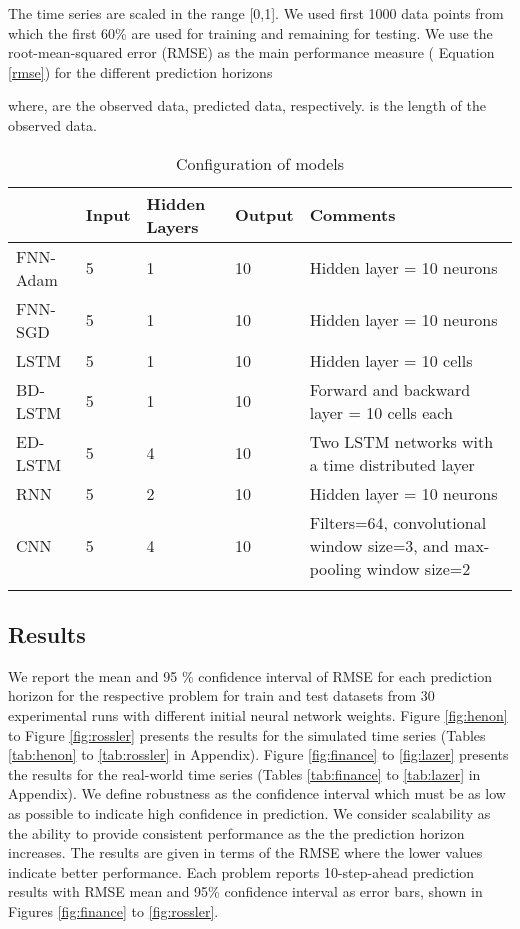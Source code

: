 \documentclass{ieeeaccess}
\begin{document}
The  time series  are  scaled in the range [0,1].  We used first 1000 data points  from which the first 60\% are used for training and remaining for testing. We use the root-mean-squared error (RMSE)   as the main performance measure ( Equation \ref{rmse})
for the different prediction horizons  
 
 
 
\noindent where,    are the observed data,
predicted data, respectively.  is the length of the observed data. 
 
 
\begin{table*}[htbp!]
 \small 
 \centering
 \caption{Configuration of models }
\label{tab:config}
\begin{tabular}{llllp{11cm}}
\hline
 &  Input & Hidden Layers & Output & Comments  \\
\hline
\hline
FNN-Adam &      5&1&10& Hidden layer =  10 neurons\\
FNN-SGD & 5 & 1&10& Hidden layer = 10 neurons\\

LSTM &      5&1&10& Hidden layer = 10 cells \\
BD-LSTM &      5&1&10&Forward and backward layer = 10 cells each \\
ED-LSTM&      5&4&10& Two LSTM networks with a time distributed layer \\
RNN &      5&2&10& Hidden layer = 10 neurons \\
CNN &      5&4&10&  Filters=64, convolutional window size=3, and max-pooling window size=2\\ 

\hline &
\end{tabular}

\end{table*}

 
 
 
\subsection{Results}

 We report the mean and 95 \% confidence interval of RMSE for each prediction horizon for the respective problem  for train and test datasets from 30 experimental runs with different initial neural network weights. Figure \ref{fig:henon} to Figure  \ref{fig:rossler} presents the results for the simulated time series  (Tables \ref{tab:henon} to \ref{tab:rossler} in Appendix). Figure \ref{fig:finance} to \ref{fig:lazer} presents the results for the real-world time series   (Tables \ref{tab:finance} to \ref{tab:lazer} in Appendix). We define robustness as the confidence interval which must be as low as possible to indicate high confidence in prediction. We consider scalability as the ability to provide consistent performance as the the prediction horizon increases. The results are given in terms of the RMSE where the lower values indicate better performance. Each problem reports 10-step-ahead prediction results  with RMSE mean and 95\% confidence interval  as  error bars, shown in Figures \ref{fig:finance} to \ref{fig:rossler}. 
\end{document}

